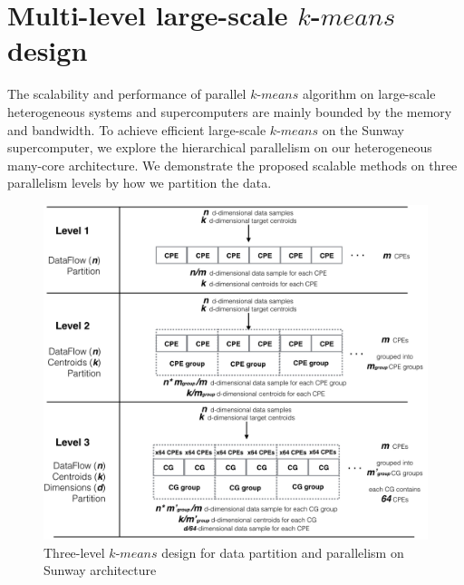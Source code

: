 \documentclass[10pt,journal,compsoc]{IEEEtran}
\begin{document}

\section{Multi-level large-scale $k$-$means$ design}
The scalability and performance of parallel $k$-$means$ algorithm on large-scale heterogeneous systems and supercomputers are mainly bounded by the memory and bandwidth. To achieve efficient large-scale $k$-$means$ on the Sunway supercomputer, we explore the hierarchical parallelism on our heterogeneous many-core architecture. We demonstrate the proposed scalable methods on three parallelism levels by how we partition the data. 

\begin{figure}
\centering
\includegraphics[scale=0.30]{partition.png}
\caption{Three-level $k$-$means$ design for data partition and parallelism on Sunway architecture}
\label{fig:fp}
\end{figure} 
\end{document}
